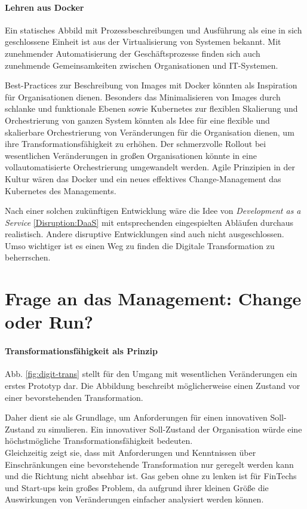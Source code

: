 \paragraph{Lehren aus Docker}
Ein statisches Abbild mit Prozessbeschreibungen und Ausführung als eine in sich geschlossene Einheit ist aus der Virtualisierung von Systemen bekannt. Mit zunehmender Automatisierung der Geschäftsprozesse finden sich auch zunehmende Gemeinsamkeiten zwischen Organisationen und IT-Systemen. 

Best-Practices zur Beschreibung von Images mit Docker könnten als Inspiration für Organisationen dienen. Besonders das Minimalisieren von Images durch schlanke und funktionale Ebenen sowie Kubernetes zur flexiblen Skalierung und Orchestrierung von ganzen System könnten als Idee für eine flexible und skalierbare Orchestrierung von Veränderungen für die Organisation dienen, um ihre Transformationsfähigkeit zu erhöhen. Der schmerzvolle Rollout bei wesentlichen Veränderungen in großen Organisationen könnte in eine vollautomatisierte Orchestrierung umgewandelt werden.
Agile Prinzipien in der Kultur wären das Docker und ein neues effektives Change-Management das Kubernetes des Managements.

Nach einer solchen zukünftigen Entwicklung wäre die Idee von \emph{Development as a Service} \ref{Disruption:DaaS} mit entsprechenden eingespielten Abläufen durchaus realistisch. Andere disruptive Entwicklungen sind auch nicht ausgeschlossen. Umso wichtiger ist es einen Weg zu finden die Digitale Transformation zu beherrschen.

%
%
%
%


\section{Frage an das Management: Change oder Run?}
\paragraph{Transformationsfähigkeit als Prinzip}
Abb. \ref{fig:digit-trans} stellt für den Umgang mit wesentlichen Veränderungen ein erstes Prototyp dar. Die Abbildung beschreibt möglicherweise einen Zustand vor einer bevorstehenden Transformation.

Daher dient sie als Grundlage, um Anforderungen für einen innovativen Soll-Zustand zu simulieren. Ein innovativer Soll-Zustand der Organisation würde eine höchstmögliche Transformationsfähigkeit bedeuten.
\medskip
\\
Gleichzeitig zeigt sie, dass mit Anforderungen und Kenntnissen über Einschränkungen eine bevorstehende Transformation nur geregelt werden kann und die Richtung nicht absehbar ist. Gas geben ohne zu lenken ist für FinTechs und Start-ups kein großes Problem, da aufgrund ihrer kleinen Größe die Auswirkungen von Veränderungen einfacher analysiert werden können.

